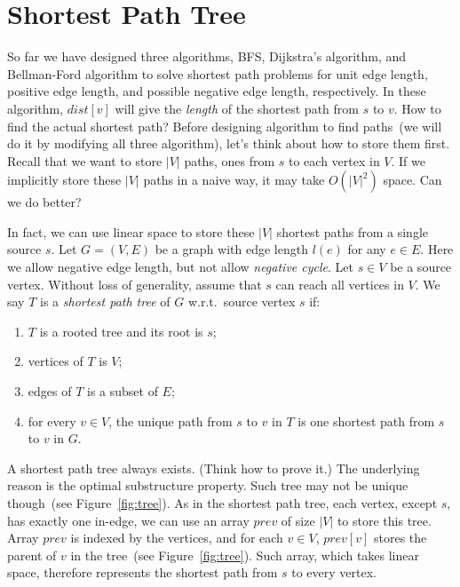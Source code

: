 \setcounter{definition}{0} \setcounter{property}{0} \setcounter{claim}{0} \setcounter{fact}{0} \setcounter{corollary}{0} \setcounter{figure}{0}
\section{Shortest Path Tree}

So far we have designed three algorithms, BFS, Dijkstra's algorithm, and Bellman-Ford algorithm
to solve shortest path problems for unit edge length, positive edge length, and possible negative edge length, respectively.
In these algorithm, $dist[v]$ will give the \emph{length} of the
shortest path from $s$ to $v$. How to find the actual shortest path?
Before designing algorithm to find paths~(we will do it by modifying all three algorithm),
let's think about how to store them first.
Recall that we want to store $|V|$ paths, ones from $s$ to each vertex in $V$.
If we implicitly store these $|V|$ paths in a naive way, it may take $O(|V|^2)$ space.
Can we do better?

In fact, we can use linear space to store these $|V|$ shortest paths from a single source $s$.
Let $G = (V, E)$ be a graph with edge length $l(e)$ for any $e \in E$.
Here we allow negative edge length, but not allow \emph{negative cycle}. %
Let $s \in V$ be a source vertex.  Without loss of generality, assume that $s$ can reach all vertices in $V$.
We say $T$ is a \emph{shortest path tree} of $G$ w.r.t.\ source vertex $s$ if:
\vspace*{-\topsep}
\begin{enumerate}
\item $T$ is a rooted tree and its root is $s$;
\item vertices of $T$ is $V$;
\item edges of $T$ is a subset of $E$;
\item for every $v\in V$, the unique path from $s$ to $v$ in $T$ is one shortest path from $s$ to $v$ in $G$.
\end{enumerate}

A shortest path tree always exists. (Think how to prove it.) 
The underlying reason is the optimal substructure property.
Such tree may not be unique though~(see Figure~\ref{fig:tree}).
As in the shortest path tree, each vertex, except $s$, has exactly one in-edge, we can use an array $prev$ of size $|V|$
to store this tree. Array $prev$ is indexed by the vertices, and for each $v\in V$, $prev[v]$ stores the parent of $v$
in the tree~(see Figure~\ref{fig:tree}).
Such array, which takes linear space, therefore represents the shortest path from $s$ to every vertex.

